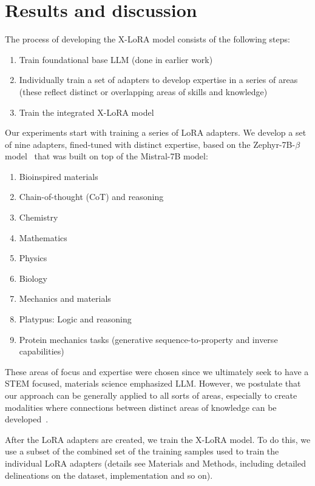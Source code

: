 \section{Results and discussion}

The process of developing the X-LoRA model consists of the following steps:
\begin{enumerate}
    \item Train foundational base LLM (done in earlier work)
    \item Individually train a set of adapters to develop expertise in a series of areas (these reflect distinct or overlapping areas of skills and knowledge)
    \item Train the integrated X-LoRA model
\end{enumerate}

Our experiments start with training a series of LoRA adapters. We develop a set of nine adapters, fined-tuned with distinct expertise, based on the Zephyr-7B-$\beta$ model~\cite{HuggingFaceH4/zephyr-7b-betaFace} that was built on top of the Mistral-7B model\cite{Jiang2023Mistral7B}:
\begin{enumerate}
    \item Bioinspired materials 
    \item Chain-of-thought (CoT) and reasoning 
    \item Chemistry
    \item Mathematics
    \item Physics
    \item Biology
    \item Mechanics and materials
    \item Platypus: Logic and reasoning 
    \item Protein mechanics tasks (generative sequence-to-property and inverse capabilities)
\end{enumerate}
These areas of focus and expertise were chosen since we ultimately seek to have a STEM focused, materials science emphasized LLM. However, we postulate that our approach can be generally applied to all sorts of areas, especially to create modalities where connections between distinct areas of knowledge can be developed~\cite{Buehler2023MechGPTModalities,Buehler2023MeLMProblemsb}. 

After the LoRA adapters are created, we train the X-LoRA model. To do this, we use a subset of the combined set of the training samples used to train the individual LoRA adapters (details see Materials and Methods, including detailed delineations on the dataset, implementation and so on). 


